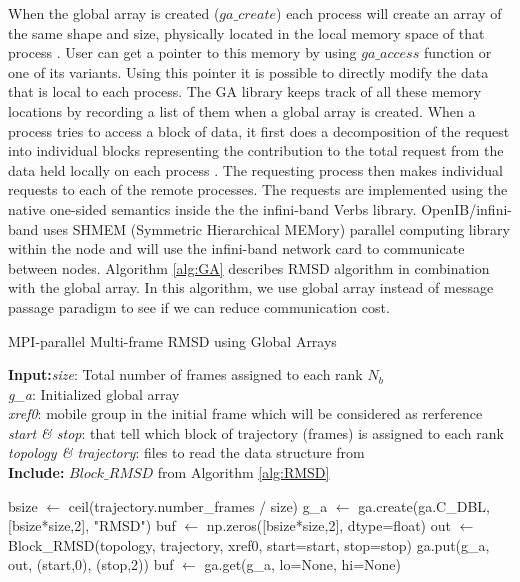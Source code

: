 When the global array is created ($ga\_create$) each process will create an array of the same shape and size, physically located in the local memory space of that process \cite{GA}. 
User can get a pointer to this memory by using $ga\_access$ function or one of its variants.
Using this pointer it is possible to directly modify the data that is local to each process.
The GA library keeps track of all these memory locations by recording a list of them when a global array is created. 
When a process tries to access a block of data, it first does a decomposition of the request into individual blocks representing the contribution to the total request from the data held locally on each process \cite{PNNL:2018}. 
The requesting process then makes individual requests to each of the remote processes. 
The requests are implemented using the native one-sided semantics inside the the infini-band Verbs library. 
OpenIB/infini-band uses SHMEM (Symmetric Hierarchical MEMory) parallel computing library \cite{SHMEM1,SHMEM2} within the node and will use the infini-band network card to communicate between nodes.
Algorithm \ref{alg:GA} describes RMSD algorithm in combination with the global array.
In this algorithm, we use global array instead of message passage paradigm to see if we can reduce communication cost. 

\begin{algorithm}[ht!]
	\scriptsize
	\caption{MPI-parallel Multi-frame RMSD using Global Arrays}
	\label{alg:GA}
	\hspace*{\algorithmicindent} \textbf{Input:}\emph{size}: Total number of frames assigned to each rank $N_{b}$\\
	\hspace*{\algorithmicindent} \emph{g\_a}: Initialized global array \\
	\hspace*{\algorithmicindent} \emph{xref0}: mobile group in the initial frame which will be considered as rerference \\
	\hspace*{\algorithmicindent} \emph{start \& stop}: that tell which block of trajectory (frames) is assigned to each rank \\
	\hspace*{\algorithmicindent} \emph{topology \& trajectory}: files to read the data structure from \\
	\hspace*{\algorithmicindent}\textbf{Include:} $Block\_RMSD$ from Algorithm \ref{alg:RMSD}
	\begin{algorithmic}[1]
		
		\State bsize $\leftarrow$ ceil(trajectory.number\_frames / size)
		\State g\_a $\leftarrow$ ga.create(ga.C\_DBL, [bsize*size,2], "RMSD")
		\State buf $\leftarrow$ np.zeros([bsize*size,2], dtype=float)
		\State out $\leftarrow$ Block\_RMSD(topology, trajectory, xref0, start=start, stop=stop)
		\State ga.put(g\_a, out, (start,0), (stop,2))
		\State buf $\leftarrow$ ga.get(g\_a, lo=None, hi=None)
		\EndIf
	\end{algorithmic}
\end{algorithm}

